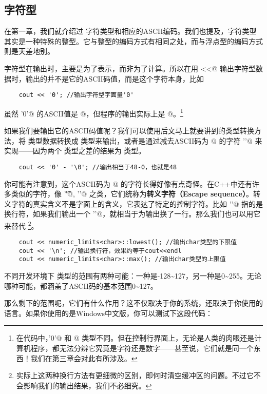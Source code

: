 \subsection*{字符型}
在第一章，我们就介绍过 \lstinline@char@ 字符类型和相应的ASCII编码。我们也提及，字符类型其实是一种特殊的整型。它与整型的编码方式有相同之处，而与浮点型的编码方式则是天差地别。\par
字符型在输出时，主要是为了表示，而非为了计算。所以在用 \lstinline@cout<<@ 输出字符型数据时，输出的并不是它的ASCII码值，而是这个字符本身，比如
\begin{lstlisting}
    cout << '0'; //输出字符型字面量'0'
\end{lstlisting}
虽然 \lstinline@'0'@ 的ASCII值是 @，但程序的输出实际上是 @。\footnote{在代码中，\lstinline@'0'@ 和 @ 类型不同。但在控制行界面上，无论是人类的肉眼还是计算机程序，都无法分辨它究竟是字符还是数字——甚至说，它们就是同一个东西！我们在第三章会对此有所涉及。}\par
如果我们要输出它的ASCII码值呢？我们可以使用后文马上就要讲到的类型转换方法，将 \lstinline@char@ 类型数据转换成 \lstinline@int@ 类型来输出，或者是通过减去ASCII码为 @ 的字符 \lstinline@'\0'@ 来实现——因为两个 \lstinline@char@ 类型之差的结果为 \lstinline@int@ 类型。
\begin{lstlisting}
    cout << '0' - '\0'; //输出相当于48-0，也就是48
\end{lstlisting}\par
你可能有注意到，这个ASCII码为 @ 的字符长得好像有点奇怪。在C++中还有许多类似的字符，像 \lstinline@'\t'@, \lstinline@'\n'@ 之类，它们统称为\textbf{转义字符（Escape sequence）}。转义字符的真实含义不是字面上的含义，它表达了特定的控制字符。比如 \lstinline@'\n'@ 指的是换行符，如果我们输出一个 \lstinline@'\n'@，就相当于为输出换了一行。那么我们也可以用它来替代 \lstinline@endl@\footnote{实际上这两种换行方法有更细微的区别，即何时清空缓冲区的问题。不过它不会影响我们的输出结果，我们不必细究。}。
\begin{lstlisting}
    cout << numeric_limits<char>::lowest(); //输出char类型的下限值
    cout << '\n'; //输出换行符，效果约等于cout<<endl
    cout << numeric_limits<char>::max(); //输出char类型的上限值
\end{lstlisting}\par
不同开发环境下 \lstinline@char@ 类型的范围有两种可能：一种是-128\~{}127，另一种是0\~{}255。无论哪种可能，都涵盖了ASCII码的基本范围0\~{}127。\par
那么剩下的范围呢，它们有什么作用？这不仅取决于你的系统，还取决于你使用的语言。如果你使用的是Windows中文版，你可以测试下这段代码：
